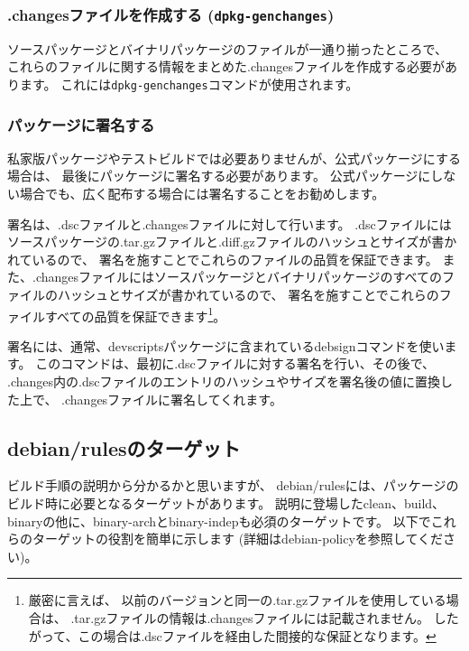 \documentclass[mingoth,a4paper]{jsarticle}
\begin{document}
\subsubsection{.changesファイルを作成する (\texttt{dpkg-genchanges})}

ソースパッケージとバイナリパッケージのファイルが一通り揃ったところで、
これらのファイルに関する情報をまとめた.changesファイルを作成する必要があります。
これには\texttt{dpkg-genchanges}コマンドが使用されます。

\subsubsection{パッケージに署名する}

私家版パッケージやテストビルドでは必要ありませんが、公式パッケージにする場合は、
最後にパッケージに署名する必要があります。
公式パッケージにしない場合でも、広く配布する場合には署名することをお勧めします。

署名は、.dscファイルと.changesファイルに対して行います。
.dscファイルにはソースパッケージの.tar.gzファイルと.diff.gzファイルのハッシュとサイズが書かれているので、
署名を施すことでこれらのファイルの品質を保証できます。
また、.changesファイルにはソースパッケージとバイナリパッケージのすべてのファイルのハッシュとサイズが書かれているので、
署名を施すことでこれらのファイルすべての品質を保証できます\footnote{厳密に言えば、
以前のバージョンと同一の.tar.gzファイルを使用している場合は、
.tar.gzファイルの情報は.changesファイルには記載されません。
したがって、この場合は.dscファイルを経由した間接的な保証となります。}。

署名には、通常、devscriptsパッケージに含まれているdebsignコマンドを使います。
このコマンドは、最初に.dscファイルに対する署名を行い、その後で、
.changes内の.dscファイルのエントリのハッシュやサイズを署名後の値に置換した上で、
.changesファイルに署名してくれます。

\subsection{debian/rulesのターゲット}

ビルド手順の説明から分かるかと思いますが、
debian/rulesには、パッケージのビルド時に必要となるターゲットがあります。
説明に登場したclean、build、binaryの他に、binary-archとbinary-indepも必須のターゲットです。
以下でこれらのターゲットの役割を簡単に示します (詳細はdebian-policyを参照してください)。
\end{document}
